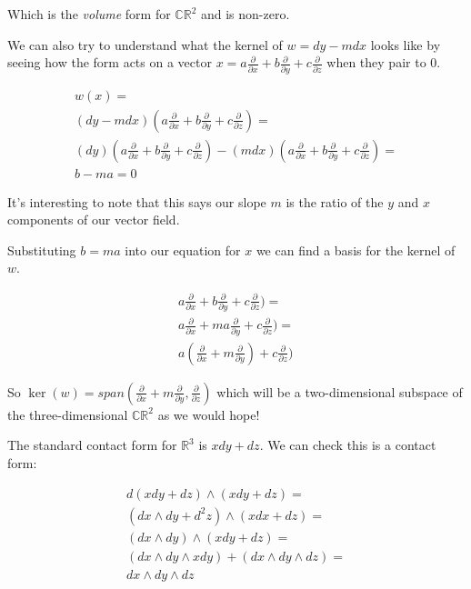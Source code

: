 \documentclass{article}
\begin{document}
Which is the \textit{volume} form for $\mathbb{CR}^{2}$ and is non-zero.

We can also try to understand what the kernel of $w = dy - mdx$ looks like by seeing
how the form acts on a vector $x = a\frac{\partial}{\partial x} +
b\frac{\partial}{\partial y} + c\frac{\partial}{\partial z}$ when they pair to 0.

\begin{align*}
  w (x) = \\
  (dy - mdx) (a\frac{\partial}{\partial x} +
  b\frac{\partial}{\partial y} + c\frac{\partial}{\partial z}) = \\
  (dy)(a\frac{\partial}{\partial x} +
b\frac{\partial}{\partial y} + c\frac{\partial}{\partial z}) - (mdx)(a\frac{\partial}{\partial x} +
b\frac{\partial}{\partial y} + c\frac{\partial}{\partial z}) = \\
  b - ma = 0
\end{align*}

It's interesting to note that this says our slope $m$ is the ratio of the $y$
and $x$ components of our vector field.

Substituting $b = ma$ into our equation for $x$ we can find a basis for the
kernel of $w$.

\begin{align*}
  a\frac{\partial}{\partial x} +
    b\frac{\partial}{\partial y} + c\frac{\partial}{\partial z}) = \\
  a\frac{\partial}{\partial x} +
    ma\frac{\partial}{\partial y} + c\frac{\partial}{\partial z}) = \\
  a(\frac{\partial}{\partial x} +
    m\frac{\partial}{\partial y}) + c\frac{\partial}{\partial z}) 
\end{align*}

So $\ker(w) = span(\frac{\partial}{\partial x} +
    m\frac{\partial}{\partial y}, \frac{\partial}{\partial z})$ which will be a
two-dimensional subspace of the three-dimensional $\mathbb{CR}^{2}$ as we would hope!

The standard contact form for $\mathbb{R}^{3}$ is $xdy + dz$. We can check this
is a contact form:

\begin{align*}
  d (xdy + dz) \wedge (xdy + dz) = \\
  (dx \wedge dy + d^{2} z) \wedge (xdx + dz) = \\
  (dx \wedge dy) \wedge (xdy + dz) = \\
  (dx \wedge dy \wedge xdy) + (dx \wedge dy \wedge dz) = \\
  dx \wedge dy \wedge dz
\end{align*}
\end{document}
